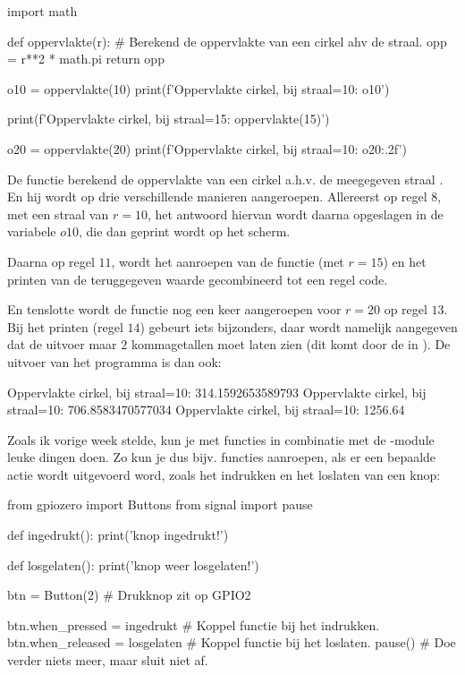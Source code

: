 \begin{python}
import math 

def oppervlakte(r):
    # Berekend de oppervlakte van een cirkel ahv de straal.
    opp = r**2 * math.pi
    return opp

o10 = oppervlakte(10)
print(f'Oppervlakte cirkel, bij straal=10: {o10}')

print(f'Oppervlakte cirkel, bij straal=15: {oppervlakte(15)}')

o20 = oppervlakte(20)
print(f'Oppervlakte cirkel, bij straal=10: {o20:.2f}')
\end{python}

De functie  berekend de oppervlakte van een cirkel a.h.v. de meegegeven straal . En hij wordt op drie verschillende manieren aangeroepen. Allereerst op regel $8$, met een straal van $r=10$, het antwoord hiervan wordt daarna opgeslagen in de variabele $o10$, die dan geprint wordt op het scherm. \newline

Daarna op regel $11$, wordt het aanroepen van de functie (met $r=15$) en het printen van de teruggegeven waarde gecombineerd tot een regel code. \newline

En tenslotte wordt de functie nog een keer aangeroepen voor $r=20$ op regel $13$. Bij het printen (regel $14$) gebeurt iets bijzonders, daar wordt namelijk aangegeven dat de uitvoer maar $2$ kommagetallen moet laten zien (dit komt door de  in ). De uitvoer van het programma is dan ook:
\begin{python}
Oppervlakte cirkel, bij straal=10: 314.1592653589793
Oppervlakte cirkel, bij straal=10: 706.8583470577034
Oppervlakte cirkel, bij straal=10: 1256.64
\end{python}

Zoals ik vorige week stelde, kun je met functies in combinatie met de -module leuke dingen doen. Zo kun je dus bijv. functies aanroepen, als er een bepaalde actie wordt uitgevoerd word, zoals het indrukken en het loslaten van een knop:
\begin{python}
from gpiozero import Buttons
from signal import pause

def ingedrukt():
	print('knop ingedrukt!')

def losgelaten():
	print('knop weer losgelaten!')

btn = Button(2)  # Drukknop zit op GPIO2

btn.when_pressed = ingedrukt    # Koppel functie bij het indrukken.
btn.when_released = losgelaten  # Koppel functie bij het loslaten.
pause()                         # Doe verder niets meer, maar sluit niet af.
\end{python}

